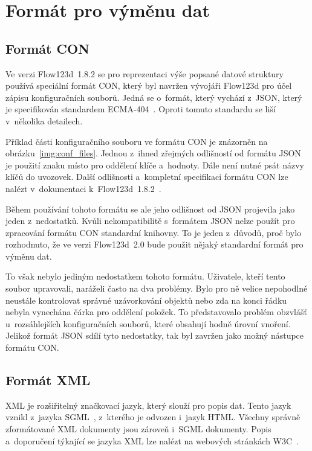 \documentclass[FM,bw,DP]{tulthesis}
\begin{document}
\section{Formát pro výměnu dat}

\subsection{Formát CON}

Ve verzi Flow123d~1.8.2 se pro reprezentaci výše popsané datové struktury používá speciální formát \gls{CON}, který byl navržen vývojáři Flow123d pro účel zápisu konfiguračních souborů. Jedná se o~formát, který vychází z~\gls{JSON}, který je specifikován standardem ECMA-404~\cite{bib:ecma404}. Oproti tomuto standardu se liší v~několika detailech.

Příklad části konfiguračního souboru ve formátu \gls{CON} je znázorněn na obrázku~\ref{img:conf_files}. Jednou z~ihned zřejmých odlišností od formátu \gls{JSON} je použití znaku \uv{\texttt{=}} místo \uv{\texttt{:}} pro oddělení klíče a~hodnoty. Dále není nutné psát názvy klíčů do uvozovek. Další odlišnosti a~kompletní specifikaci formátu \gls{CON} lze nalézt v~dokumentaci k~Flow123d~1.8.2~\cite{bib:flow123d-manual}.

Během používání tohoto formátu se ale jeho odlišnost od \gls{JSON} projevila jako jeden z~nedostatků. Kvůli nekompatibilitě s~formátem \gls{JSON} nelze použít pro zpracování formátu \gls{CON} standardní knihovny. To je jeden z~důvodů, proč bylo rozhodnuto, že ve verzi Flow123d~2.0 bude použit nějaký standardní formát pro výměnu dat.

To však nebylo jediným nedostatkem tohoto formátu. Uživatele, kteří tento soubor upravovali, naráželi často na dva problémy. Bylo pro ně velice nepohodlné neustále kontrolovat správné uzávorkování objektů nebo zda na konci řádku nebyla vynechána čárka pro oddělení položek. To představovalo problém  obzvlášť u~rozsáhlejších konfiguračních souborů, které obsahují hodně úrovní vnoření. Jelikož formát \gls{JSON} sdílí tyto nedostatky, tak byl zavržen jako možný nástupce formátu \gls{CON}.

\subsection{Formát XML}

\gls{XML} je rozšiřitelný značkovací jazyk, který slouží pro popis dat. Tento jazyk vznikl z~jazyka \gls{SGML}~\cite{bib:sgml-iso}, z~kterého je odvozen i~jazyk \gls{HTML}. Všechny správně zformátované \gls{XML} dokumenty jsou zároveň i~\gls{SGML} dokumenty. Popis a~doporučení týkající se jazyka \gls{XML} lze nalézt na webových stránkách \gls{W3C}~\cite{bib:xml}.
\end{document}
